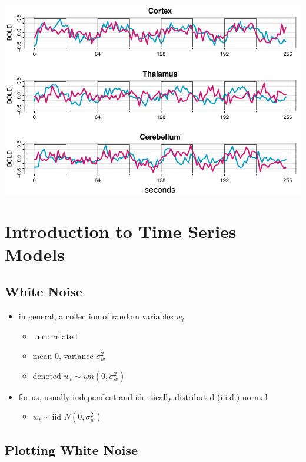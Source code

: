 \documentclass[
  letterpaper,
  DIV=11,
  numbers=noendperiod]{scrreprt}
\providecommand{\tightlist}{%
  \setlength{\itemsep}{0pt}\setlength{\parskip}{0pt}}\usepackage{longtable,booktabs,array}
\begin{document}
\includegraphics{LectureNotes/Lecture1_files/figure-pdf/ex-1-6-1.pdf}

\chapter{Introduction to Time Series
Models}\label{introduction-to-time-series-models}

\section{White Noise}\label{white-noise}

\begin{itemize}
\item
  in general, a collection of random variables \(w_t\)

  \begin{itemize}
  \item
    uncorrelated
  \item
    mean 0, variance \(\sigma_w^2\)
  \item
    denoted \(w_t \sim wn(0, \sigma_w^2)\)
  \end{itemize}
\item
  for us, usually independent and identically distributed (i.i.d.)
  normal

  \begin{itemize}
  \tightlist
  \item
    \(w_t \sim \text{iid } N(0, \sigma_w^2)\)
  \end{itemize}
\end{itemize}

\section{Plotting White Noise}\label{plotting-white-noise}
\end{document}
